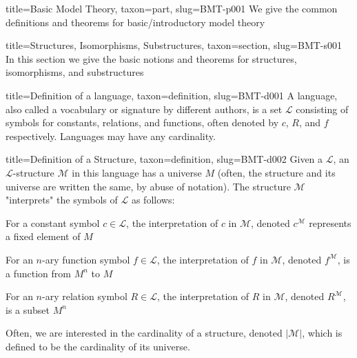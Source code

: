 \documentclass[a4paper]{article}
\begin{document}
  
\begin{tree}{title={Basic Model Theory}, taxon={part}, slug={BMT-p001}}
We give the common definitions and theorems for basic/introductory model theory
  
  
\begin{tree}{title={Structures, Isomorphisms, Substructures}, taxon={section}, slug={BMT-s001}}
In this section we give the basic notions and theorems for structures, isomorphisms, and substructures
\begin{tree}{title={Definition of a language}, taxon={definition}, slug={BMT-d001}}
A language, also called a vocabulary or signature by different authors, is a set \(\mathcal {L}\) consisting of symbols for constants, relations, and functions, 
often denoted by \(c\), \(R\), and \(f\) respectively. Languages may have any cardinality.
\end{tree}

\begin{tree}{title={Definition of a Structure}, taxon={definition}, slug={BMT-d002}}
Given a  \(\mathcal {L}\), an \(\mathcal {L}\)-structure \(\mathcal {M}\) in this language has a universe \(M\) (often, the structure and its universe 
are written the same, by abuse of notation). The structure \(\mathcal {M}\) "interprets" the symbols of \(\mathcal {L}\) as follows:\par{For a constant symbol \(c \in   \mathcal {L}\), the interpretation of \(c\) in \(\mathcal {M}\), denoted \(c^{ \mathcal {M}}\) represents a fixed 
element of \(M\)}\par{For an \(n\)-ary function symbol \(f \in   \mathcal {L}\), the interpretation of \(f\) in \(\mathcal {M}\), denoted \(f^{ \mathcal {M}}\),
is a function from \(M^n\) to \(M\)}\par{For an \(n\)-ary relation symbol \(R \in   \mathcal {L}\), the interpretation of \(R\) in \(\mathcal {M}\), denoted \(R^{ \mathcal {M}}\),
is a subset \(M^n\)}\par{Often, we are interested in the cardinality of a structure, denoted \(| \mathcal {M}|\), which is defined to be the cardinality of its universe.}
\end{tree}


\end{tree}
\end{tree}
\end{document}
